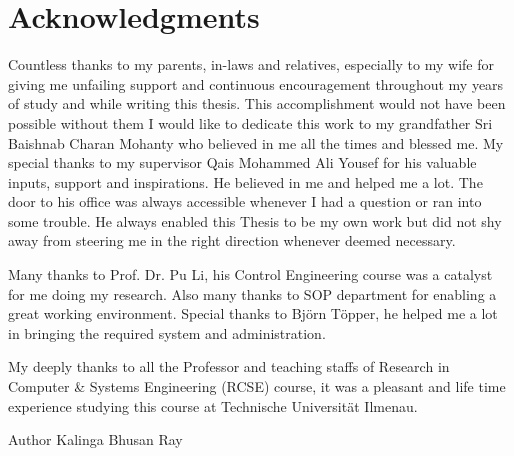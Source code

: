 
\cleardoublepage
\setcounter{savepage}{\thepage}
\begin{abstractpage}

\end{abstractpage}

% 

\cleardoublepage

\section*{Acknowledgments}
\begin{flushleft}
Countless thanks to my parents, in-laws and relatives, especially to my wife
for giving me unfailing support and continuous encouragement throughout my 
years of study and while writing this thesis. This accomplishment would not 
have been possible without them I would like to dedicate this work to my 
grandfather Sri Baishnab Charan Mohanty who believed in me all the times
and blessed me.
\baselineskip
My special thanks to my supervisor Qais Mohammed Ali Yousef for his valuable
inputs, support and inspirations. He believed in me and helped me a lot.
The door to his office was always accessible whenever I had a question 
or ran into some trouble. He always enabled this Thesis to be my own work 
but did not shy away from steering me in the right direction whenever deemed necessary.
\baselineskip
\par
Many thanks to Prof. Dr. Pu Li, his Control Engineering course was a 
catalyst for me doing my research. Also many thanks to SOP department for 
enabling a great working environment. Special thanks to Bj{\"o}rn T{\"o}pper, 
he helped me a lot in bringing the required system and administration.
\baselineskip
\par
My deeply thanks to all the Professor and teaching staffs of Research 
in Computer \& Systems Engineering (RCSE) course, it was a pleasant and life 
time experience studying this course at Technische Universit{\"a}t Ilmenau.
\baselineskip
\par
Author
Kalinga Bhusan Ray
\end{flushleft}

